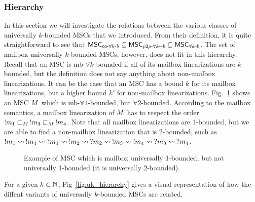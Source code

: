 \subsubsection{Hierarchy}

In this section we will investigate the relations between the various classes of universally $k$-bounded MSCs that we introduced. From their definition, it is quite straightforward to see that $\mathsf{MSC}_{\mathsf{co}\text{-}\forall k\text{-}b} \subseteq \mathsf{MSC}_{p2p\text{-}\forall k\text{-}\text{-}b} \subseteq \mathsf{MSC}_{\forall k\text{-}b}$. The set of mailbox universally $k$-bounded MSCs, however, does not fit in this hierarchy. Recall that an MSC is mb-$\forall k$-bounded if all of its mailbox linearizations are $k$-bounded, but the definition does not say anything about non-mailbox linearizations. It can be the case that an MSC has a bound $k$ for its mailbox linearizations, but a higher bound $k'$ for non-mailbox linearizations. Fig.~\ref{fig:mb_uk} shows an MSC $M$ which is mb-$\forall 1$-bounded, but $\forall 2$-bounded. According to the mailbox semantics, a mailbox linearization of $M$ has to respect the order $!m_1 \sqsubset_M\, !m_3 \sqsubset_M\, !m_4$. Note that all mailbox linearizations are $1$-bounded, but we are able to find a non-mailbox linearization that is 2-bounded, such as $!m_1 \rightsquigarrow\, !m_4 \rightsquigarrow\, ?m_1 \rightsquigarrow\, !m_2 \rightsquigarrow\, ?m_2 \rightsquigarrow\, !m_3 \rightsquigarrow\, !m_4 \rightsquigarrow\, ?m_3 \rightsquigarrow\, ?m_4$.

\begin{figure}[h]
\begin{center}
\caption{Example of MSC which is mailbox universally 1-bounded, but not universally 1-bounded (it is universally 2-bounded).}
\label{fig:mb_uk}
\end{center}
\end{figure}

For a given $k \in \mathbb{N}$, Fig~\ref{fig:uk_hierarchy} gives a visual representation of how the diffent variants of universally $k$-bounded MSCs are related.


